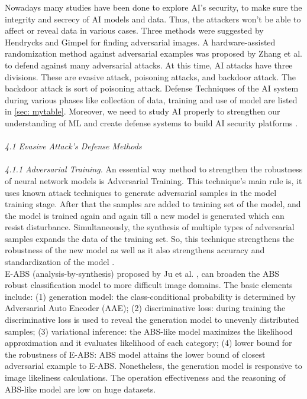 \documentclass{article}
\begin{document}
Nowadays many studies have been done to explore AI’s security, to make sure the integrity and secrecy of AI models and data. Thus, the attackers won’t be able to affect or reveal data in various cases. Three methods were suggested by Hendrycks and Gimpel \cite{hendrycks2016early} for finding adversarial images. A hardware-assisted randomization method against adversarial examples was proposed by Zhang et al. \cite{zhang2020hrae} to defend against many adversarial attacks.  At this time, AI attacks have three divisions. These are evasive attack, poisoning attacks, and backdoor attack. The backdoor attack is sort of poisoning attack. Defense Techniques of the AI system during various phases like collection of data, training and use of model are listed in \ref{sec: mytable}. Moreover, we need to study AI properly to strengthen our understanding of ML and create defense systems to build AI security platforms \cite{kong2021survey}.
\\\\
\textit{4.1 Evasive Attack’s Defense Methods}
\\\\
\textit{4.1.1 Adversarial Training.}
An essential way method to strengthen the robustness of neural network models is Adversarial Training. This technique’s main rule is, it uses known attack techniques to generate adversarial samples in the model training stage. After that the samples are added to training set of the model, and the model is trained again and again till a new model is generated which can resist disturbance. Simultaneously, the synthesis of multiple types of adversarial samples expands the data of the training set. So, this technique strengthens the robustness of the new model as well as it also strengthens accuracy and standardization of the model \cite{wang2019beyond}.
\\
E-ABS (analysis-by-synthesis) proposed by Ju et al. \cite{ju2020abs}, can broaden the ABS robust classification model to more difficult image domains. The basic elements include: (1) generation model: the class-conditional probability is determined by Adversarial Auto Encoder (AAE); (2) discriminative loss: during training the discriminative loss is used to reveal the generation model to unevenly distributed samples; (3) variational inference: the ABS-like model maximizes the likelihood approximation and it evaluates likelihood of each category; (4) lower bound for the robustness of E-ABS: ABS model attains the lower bound of closest adversarial example to E-ABS. Nonetheless, the generation model is responsive to image likeliness calculations. The operation effectiveness and the reasoning of ABS-like model are low on huge datasets.
\end{document}

